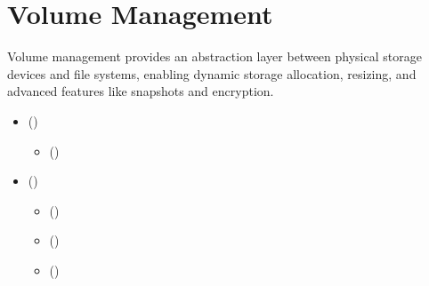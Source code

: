 \documentclass[letterpaper,10pt,english]{sphinxmanual}
\begin{document}
\chapter{Volume Management}
\label{\detokenize{volume-management:volume-management}}\label{\detokenize{volume-management::doc}}
\sphinxAtStartPar
Volume management provides an abstraction layer between physical storage devices and file systems, enabling dynamic storage allocation, resizing, and advanced features like snapshots and encryption.

\begin{sphinxcontents}
\begin{itemize}
\item {} 
\sphinxAtStartPar
{}\label{\detokenize{volume-management:id1}}{\hyperref[\detokenize{volume-management:introduction-to-volume-management}]{}} ()
\begin{itemize}
\item {} 
\sphinxAtStartPar
{}\label{\detokenize{volume-management:id2}}{\hyperref[\detokenize{volume-management:key-concepts}]{}} ()

\end{itemize}

\item {} 
\sphinxAtStartPar
{}\label{\detokenize{volume-management:id3}}{\hyperref[\detokenize{volume-management:lvm-logical-volume-manager}]{}} ()
\begin{itemize}
\item {} 
\sphinxAtStartPar
{}\label{\detokenize{volume-management:id4}}{\hyperref[\detokenize{volume-management:installation-and-setup}]{}} ()

\item {} 
\sphinxAtStartPar
{}\label{\detokenize{volume-management:id5}}{\hyperref[\detokenize{volume-management:creating-physical-volumes}]{}} ()

\item {} 
\sphinxAtStartPar
{}\label{\detokenize{volume-management:id6}}{\hyperref[\detokenize{volume-management:creating-volume-groups}]{}} ()


\end{itemize}
\end{itemize}
\end{sphinxcontents}
\end{document}
